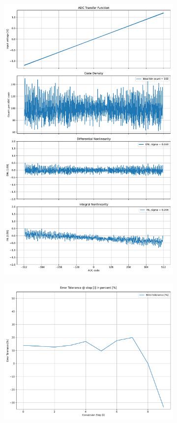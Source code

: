 \documentclass[varwidth]{standalone}
\begin{document}
\begin{figure}
\begin{subfigure}{0.32\textwidth}
    \includegraphics[width=\textwidth]{behavioral_10b_noisy_radix175norm_nonlinearity.pdf}
\end{subfigure}
\begin{subfigure}{0.32\textwidth}
    \includegraphics[width=\textwidth]{behavioral_10b_noisy_radix175norm_redundancy.pdf}

\end{subfigure}
\end{figure}
\end{document}
